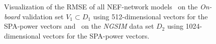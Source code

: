 \begin{figure}[t!]
	\centering
    \caption{Visualization of the \ac{RMSE} of all \ac{NEF}-network models~\protect{} on the \emph{On-board} validation set $V_1 \subset D_1$ using \num{512}-dimensional vectors for the \ac{SPA}-power vectors and~\protect{} on the \emph{\ac{NGSIM}} data set $D_2$ using \num{1024}-dimensional vectors for the \ac{SPA}-power vectors.}\label{fig:rmse_nef_nets}

\end{figure}

